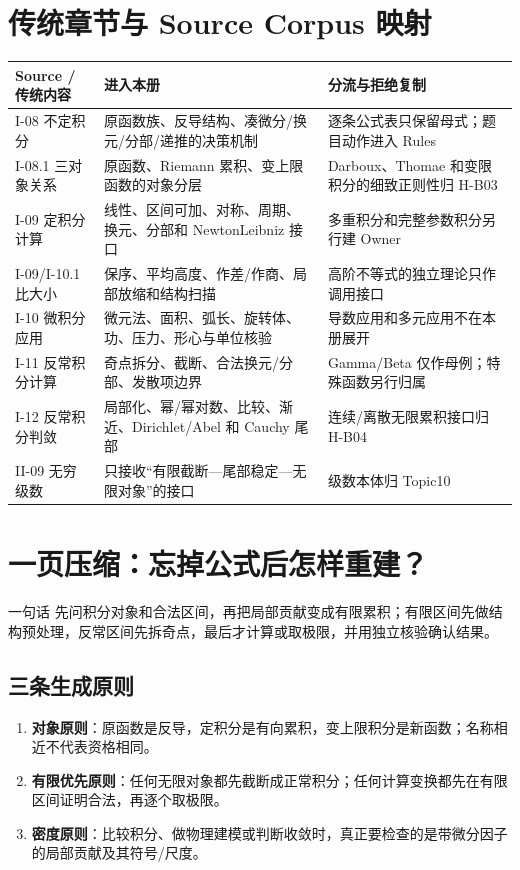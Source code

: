 \documentclass[11pt,a4paper,fontset=fandol]{ctexart}
\newcommand{\kw}[1]{\textbf{\color{deep}#1}}
\begin{document}
\section{传统章节与 Source Corpus 映射}

\begin{longtable}{L{2.55cm}L{5.35cm}L{\dimexpr\linewidth-7.90cm\relax}}
\toprule
\textbf{Source / 传统内容} & \textbf{进入本册} & \textbf{分流与拒绝复制}\\
\midrule
I-08 不定积分 & 原函数族、反导结构、凑微分/换元/分部/递推的决策机制 & 逐条公式表只保留母式；题目动作进入 Rules\\
I-08.1 三对象关系 & 原函数、Riemann 累积、变上限函数的对象分层 & Darboux、Thomae 和变限积分的细致正则性归 H-B03\\
I-09 定积分计算 & 线性、区间可加、对称、周期、换元、分部和 Newton\textendash{}Leibniz 接口 & 多重积分和完整参数积分另行建 Owner\\
I-09/I-10.1 比大小 & 保序、平均高度、作差/作商、局部放缩和结构扫描 & 高阶不等式的独立理论只作调用接口\\
I-10 微积分应用 & 微元法、面积、弧长、旋转体、功、压力、形心与单位核验 & 导数应用和多元应用不在本册展开\\
I-11 反常积分计算 & 奇点拆分、截断、合法换元/分部、发散项边界 & Gamma/Beta 仅作母例；特殊函数另行归属\\
I-12 反常积分判敛 & 局部化、幂/幂对数、比较、渐近、Dirichlet/Abel 和 Cauchy 尾部 & 连续/离散无限累积接口归 H-B04\\
II-09 无穷级数 & 只接收“有限截断—尾部稳定—无限对象”的接口 & 级数本体归 Topic10\\
\bottomrule
\end{longtable}

\section{一页压缩：忘掉公式后怎样重建？}

\begin{corebox}{一句话}
先问积分对象和合法区间，再把局部贡献变成有限累积；有限区间先做结构预处理，反常区间先拆奇点，最后才计算或取极限，并用独立核验确认结果。
\end{corebox}

\subsection{三条生成原则}
\begin{enumerate}
  \item \kw{对象原则}：原函数是反导，定积分是有向累积，变上限积分是新函数；名称相近不代表资格相同。
  \item \kw{有限优先原则}：任何无限对象都先截断成正常积分；任何计算变换都先在有限区间证明合法，再逐个取极限。
  \item \kw{密度原则}：比较积分、做物理建模或判断收敛时，真正要检查的是带微分因子的局部贡献及其符号/尺度。
\end{enumerate}
\end{document}
